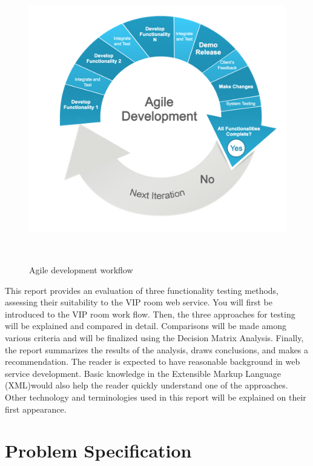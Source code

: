 \documentclass[12pt]{article}
\begin{document}
\begin{figure}[ht!]
\centering
\includegraphics[width=12.5cm,height=12.5cm,keepaspectratio]{img/agile.png}
\caption{Agile development workflow}
\label{overflow}
\end{figure}

This report provides an evaluation of three functionality testing methods, assessing their 
suitability to the VIP room web service. You will first be introduced to the VIP room work flow. Then, the three approaches for testing will be explained and compared in detail. Comparisons will be made among various criteria and will be finalized using the Decision Matrix Analysis. Finally, the report summarizes the results of the analysis, draws 
conclusions, and makes a recommendation. The reader is expected to have reasonable background in web service development. Basic knowledge in the Extensible Markup Language (XML)would also help the reader quickly understand one of the approaches. Other technology and terminologies used in this report will be explained on their first appearance.\\



\newpage

\section{Problem Specification}
\end{document}
